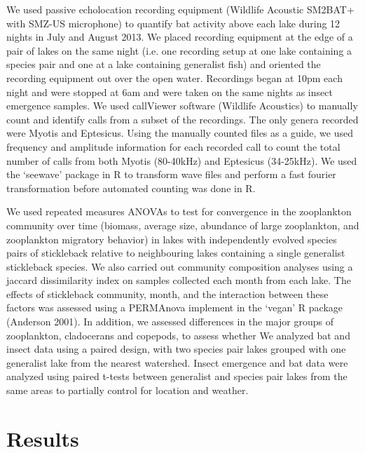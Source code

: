 \documentclass[11pt]{article}
\begin{document}
We used passive echolocation recording equipment (Wildlife Acoustic SM2BAT+ with SMZ-US microphone) to quantify bat activity above each lake during 12 nights in July and August 2013.  We placed recording equipment at the edge of a pair of lakes on the same night (i.e. one recording setup at one lake containing a species pair and one at a lake containing generalist fish) and oriented the recording equipment out over the open water.  Recordings began at 10pm each night and were stopped at 6am and were taken on the same nights as insect emergence samples.  We used callViewer software (Wildlife Acoustics) to manually count and identify calls from a subset of the recordings.  The only genera recorded were Myotis and Eptesicus.  Using the manually counted files as a guide, we used frequency and amplitude information for each recorded call to count the total number of calls from both Myotis (80-40kHz) and Eptesicus (34-25kHz).  We used the ‘seewave’ package in R to transform wave files and perform a fast fourier transformation before automated counting was done in R.  

We used repeated measures ANOVAs to test for convergence in the zooplankton community over time (biomass, average size, abundance of large zooplankton, and zooplankton migratory behavior) in lakes with independently evolved species pairs of stickleback relative to neighbouring lakes containing a single generalist stickleback species.  We also carried out community composition analyses using a jaccard dissimilarity index on samples collected each month from each lake.  The effects of stickleback community, month, and the interaction between these factors was assessed using a PERMAnova implement in the ‘vegan’ R package (Anderson 2001).  In addition, we assessed differences in the major groups of zooplankton, cladocerans and copepods, to assess whether We analyzed bat and insect data using a paired design, with two species pair lakes grouped with one generalist lake from the nearest watershed. Insect emergence and bat data were analyzed using paired t-tests between generalist and species pair lakes from the same areas to partially control for location and weather. 



\section*{Results}
\end{document}
